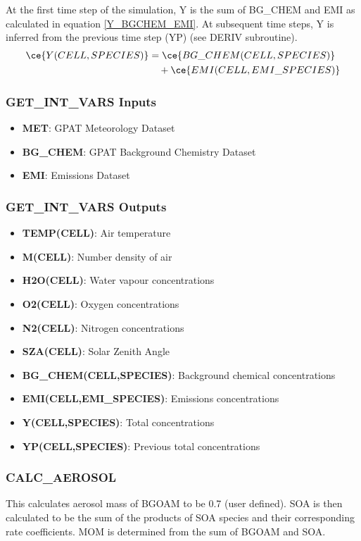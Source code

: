 At the first time step of the simulation, Y is the sum of BG\_CHEM and EMI as calculated in equation \eqref{Y_BGCHEM_EMI}. At subsequent time steps, Y is inferred from the previous time step (YP) (see DERIV subroutine).
\begin{align}\label{Y_BGCHEM_EMI}
    \ce{Y(CELL,SPECIES)} &= \ce{BG\_CHEM(CELL,SPECIES)} \notag \\
    &\quad + \ce{EMI(CELL,EMI\_SPECIES)}
\end{align}
\subsubsection{GET\_INT\_VARS Inputs}
\begin{itemize}
    \item \textbf{MET}: GPAT Meteorology Dataset
    \item \textbf{BG\_CHEM}: GPAT Background Chemistry Dataset
    \item \textbf{EMI}: Emissions Dataset
\end{itemize}

\subsubsection{GET\_INT\_VARS Outputs}
\begin{itemize}
    \item \textbf{TEMP(CELL)}: Air temperature
    \item \textbf{M(CELL)}: Number density of air
    \item \textbf{H2O(CELL)}: Water vapour concentrations
    \item \textbf{O2(CELL)}: Oxygen concentrations
    \item \textbf{N2(CELL)}: Nitrogen concentrations
    \item \textbf{SZA(CELL)}: Solar Zenith Angle
    \item \textbf{BG\_CHEM(CELL,SPECIES)}: Background chemical concentrations
    \item \textbf{EMI(CELL,EMI\_SPECIES)}: Emissions concentrations
    \item \textbf{Y(CELL,SPECIES)}: Total concentrations
    \item \textbf{YP(CELL,SPECIES)}: Previous total concentrations
\end{itemize}

\subsubsection{CALC\_AEROSOL}
This calculates aerosol mass of BGOAM to be 0.7 (user defined). SOA is then calculated to be the sum of the products of SOA species and their corresponding rate coefficients. MOM is determined from the sum of BGOAM and SOA.

